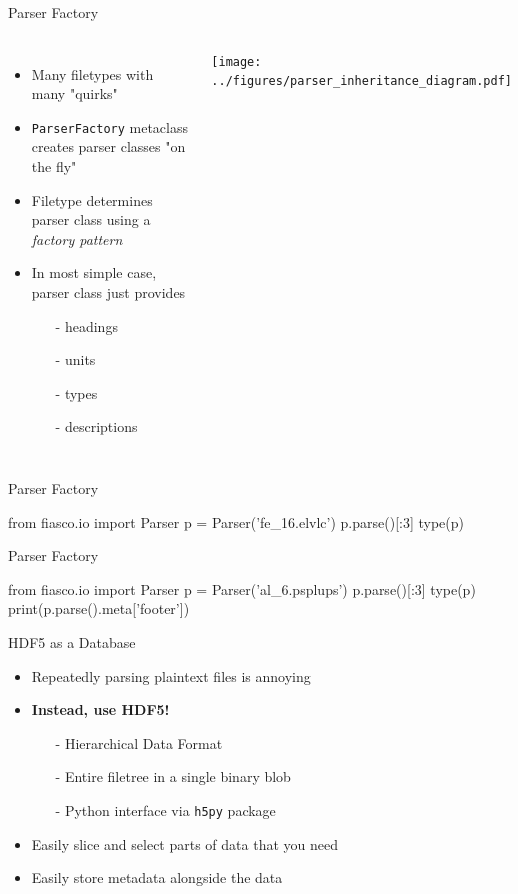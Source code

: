 \documentclass[12pt,aspectratio=169]{beamer}
\begin{document}
\begin{frame}{Parser Factory}
    \begin{columns}
            \begin{itemize}
                \item Many filetypes with many "quirks"
                \item \texttt{ParserFactory} metaclass creates parser classes "on the fly"
                \item Filetype determines parser class using a \emph{factory pattern}
                \item In most simple case, parser class just provides
                \begin{itemize}
                    \item[-] headings
                    \item[-] units
                    \item[-] types
                    \item[-] descriptions
                \end{itemize}
            \end{itemize}
            \texttt{[image: ../figures/parser\_inheritance\_diagram.pdf]}
    \end{columns}
\end{frame}
\begin{frame}[fragile]{Parser Factory}
\footnotesize
\begin{pyconsole}
from fiasco.io import Parser
p = Parser('fe_16.elvlc')
p.parse()[:3]
type(p)
\end{pyconsole}
\end{frame}
\begin{frame}[fragile]{Parser Factory}
\scriptsize
\begin{pyconsole}
from fiasco.io import Parser
p = Parser('al_6.psplups')
p.parse()[:3]
type(p)
print(p.parse().meta['footer'])
\end{pyconsole}
\end{frame}
\begin{frame}{HDF5 as a Database}
    \begin{itemize}
        \item Repeatedly parsing plaintext files is annoying
        \item \textbf{Instead, use HDF5!}
        \begin{itemize}
            \item[-] Hierarchical Data Format
            \item[-] Entire filetree in a single binary blob
            \item[-] Python interface via \texttt{h5py} package 
        \end{itemize}
        \item Easily slice and select parts of data that you need
        \item Easily store metadata alongside the data
    \end{itemize}
\end{frame}
\end{document}

